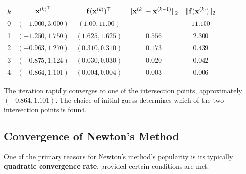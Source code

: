\begin{exampleBox}
\begin{center}
\begin{tabular}{@{}ccccc@{}}
\toprule
$k$ & $\mathbf{x}^{(k)^\top}$ & $\mathbf{f}(\mathbf{x}^{(k)})^\top$ & $\|\mathbf{x}^{(k)}-\mathbf{x}^{(k-1)}\|_2$ & $\|\mathbf{f}(\mathbf{x}^{(k)})\|_2$ \\ \midrule
0 & $(-1.000, 3.000)$ & $(1.00, 11.00)$ & --- & $11.100$ \\
1 & $(-1.250, 1.750)$ & $(1.625, 1.625)$ & $0.556$ & $2.300$ \\
2 & $(-0.963, 1.270)$ & $(0.310, 0.310)$ & $0.173$ & $0.439$ \\
3 & $(-0.875, 1.124)$ & $(0.030, 0.030)$ & $0.020$ & $0.042$ \\
4 & $(-0.864, 1.101)$ & $(0.004, 0.004)$ & $0.003$ & $0.006$ \\
\bottomrule
\end{tabular}
\end{center}

The iteration rapidly converges to one of the intersection points, approximately $(-0.864, 1.101)$. The choice of initial guess determines which of the two intersection points is found.

\end{exampleBox}

\subsection{Convergence of Newton's Method}
One of the primary reasons for Newton's method's popularity is its typically \textbf{quadratic convergence rate}, provided certain conditions are met.


